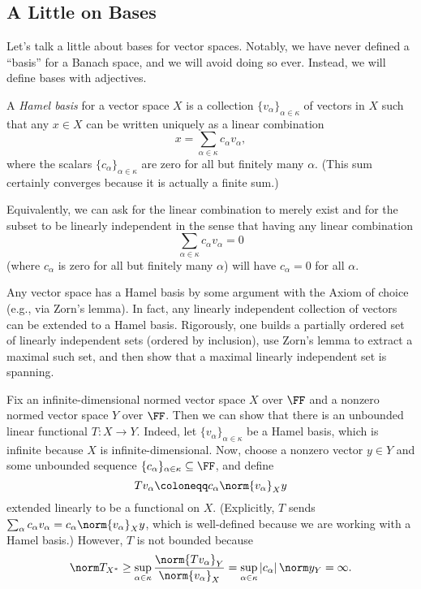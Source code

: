 \documentclass[../notes.tex]{subfiles}
\begin{document}
\subsection{A Little on Bases}
Let's talk a little about bases for vector spaces. Notably, we have never defined a ``basis'' for a Banach space, and we will avoid doing so ever. Instead, we will define bases with adjectives.
\begin{definition}
	A \textit{Hamel basis} for a vector space $X$ is a collection $\{v_\alpha\}_{\alpha\in\kappa}$ of vectors in $X$ such that any $x\in X$ can be written uniquely as a linear combination
	\[x=\sum_{\alpha\in\kappa}c_\alpha v_\alpha,\]
	where the scalars $\{c_\alpha\}_{\alpha\in\kappa}$ are zero for all but finitely many $\alpha$. (This sum certainly converges because it is actually a finite sum.)
\end{definition}
\begin{remark}
	Equivalently, we can ask for the linear combination to merely exist and for the subset to be linearly independent in the sense that having any linear combination
	\[\sum_{\alpha\in\kappa}c_\alpha v_\alpha=0\]
	(where $c_\alpha$ is zero for all but finitely many $\alpha$) will have $c_\alpha=0$ for all $\alpha$.
\end{remark}
\begin{remark}
	Any vector space has a Hamel basis by some argument with the Axiom of choice (e.g., via Zorn's lemma). In fact, any linearly independent collection of vectors can be extended to a Hamel basis. Rigorously, one builds a partially ordered set of linearly independent sets (ordered by inclusion), use Zorn's lemma to extract a maximal such set, and then show that a maximal linearly independent set is spanning.
\end{remark}
\begin{remark}
	Fix an infinite-dimensional normed vector space $X$ over $\FF$ and a nonzero normed vector space $Y$ over $\FF$. Then we can show that there is an unbounded linear functional $T\colon X\to Y$. Indeed, let $\{v_\alpha\}_{\alpha\in\kappa}$ be a Hamel basis, which is infinite because $X$ is infinite-dimensional. Now, choose a nonzero vector $y\in Y$ and some unbounded sequence $\{c_\alpha\}_{\alpha\in\kappa}\subseteq\FF$, and define
	\[Tv_\alpha\coloneqq c_\alpha\norm{v_\alpha}_Xy\]
	extended linearly to be a functional on $X$. (Explicitly, $T$ sends $\sum_{\alpha}c_\alpha v_\alpha=c_\alpha\norm{v_\alpha}_Xy$, which is well-defined because we are working with a Hamel basis.) However, $T$ is not bounded because
	\[\norm T_{X^*}\ge\sup_{\alpha\in\kappa}\frac{\norm{Tv_\alpha}_Y}{\norm{v_\alpha}_X}=\sup_{\alpha\in\kappa}\left|c_\alpha\right|\norm y_Y=\infty.\]
\end{remark}
\end{document}
